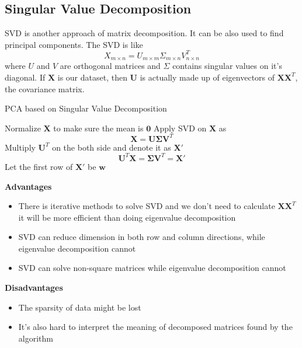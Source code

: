 \documentclass{article}
\begin{document}
\subsection{Singular Value Decomposition}
SVD is another approach of matrix decomposition. It can be also used to find principal components. The SVD is like
\begin{equation}
  X_{m\times n}=U_{m\times m}\Sigma_{m\times n}V^T_{n\times n}
\end{equation}
where $U$ and $V$ are orthogonal matrices and $\Sigma$ contains singular values on it's diagonal.
If $\mathbf{X}$ is our dataset, then $\mathbf{U}$ is actually made up of eigenvectors of $\mathbf{XX}^T$, the covariance matrix.
\begin{algorithm}[htbp]
  \caption{PCA based on Singular Value Decomposition}
  \label{alg:sc-svd}
  \vspace{0.25\baselineskip}
  \BlankLine
  Normalize $\mathbf{X}$ to make sure the mean is $\mathbf{0}$
  \BlankLine
  Apply SVD on $\mathbf{X}$ as $$\mathbf{X}=\mathbf{U\Sigma V}^T$$
  \BlankLine
  Multiply $\mathbf{U}^T$ on the both side and denote it as $\mathbf{X'}$ $$\mathbf{U}^T\mathbf{X}=\mathbf{\Sigma V}^T=\mathbf{X'}$$
  \BlankLine
  Let the first row of $\mathbf{X'}$ be $\mathbf{w}$\\
  \BlankLine
\end{algorithm}
\par \textbf{Advantages}
\begin{itemize}
  \item There is iterative methods to solve SVD and we don't need to calculate $\mathbf{XX}^T$ it will be more efficient than doing eigenvalue decomposition
  \item SVD can reduce dimension in both row and column directions, while eigenvalue decomposition cannot
  \item SVD can solve non-square matrices while eigenvalue decomposition cannot
\end{itemize}
\par \textbf{Disadvantages}
\begin{itemize}
  \item The sparsity of data might be lost
  \item It's also hard to interpret the meaning of decomposed matrices found by the algorithm
\end{itemize}
\end{document}
